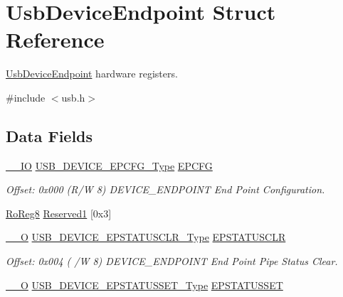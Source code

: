 \hypertarget{struct_usb_device_endpoint}{}\section{Usb\+Device\+Endpoint Struct Reference}
\label{struct_usb_device_endpoint}


\mbox{\hyperlink{struct_usb_device_endpoint}{Usb\+Device\+Endpoint}} hardware registers.  




{\ttfamily \#include $<$usb.\+h$>$}

\subsection*{Data Fields}
\begin{DoxyCompactItemize}
\item 
\mbox{\hyperlink{core__cm0plus_8h_aec43007d9998a0a0e01faede4133d6be}{\+\_\+\+\_\+\+IO}} \mbox{\hyperlink{union_u_s_b___d_e_v_i_c_e___e_p_c_f_g___type}{U\+S\+B\+\_\+\+D\+E\+V\+I\+C\+E\+\_\+\+E\+P\+C\+F\+G\+\_\+\+Type}} \mbox{\hyperlink{struct_usb_device_endpoint_aa4114789acba20c3584bf754ce06949e}{E\+P\+C\+FG}}
\begin{DoxyCompactList}\small\item\em Offset\+: 0x000 (R/W 8) D\+E\+V\+I\+C\+E\+\_\+\+E\+N\+D\+P\+O\+I\+NT End Point Configuration. \end{DoxyCompactList}\item 
\mbox{\hyperlink{group___s_a_m_d21_e15_a__definitions_ga0d957f1433aaf5d70e4dc2b68288442d}{Ro\+Reg8}} \mbox{\hyperlink{struct_usb_device_endpoint_a0ec4ccebd5bfbf4f17510e15a5a9ff81}{Reserved1}} \mbox{[}0x3\mbox{]}
\item 
\mbox{\hyperlink{core__cm0plus_8h_a7e25d9380f9ef903923964322e71f2f6}{\+\_\+\+\_\+O}} \mbox{\hyperlink{union_u_s_b___d_e_v_i_c_e___e_p_s_t_a_t_u_s_c_l_r___type}{U\+S\+B\+\_\+\+D\+E\+V\+I\+C\+E\+\_\+\+E\+P\+S\+T\+A\+T\+U\+S\+C\+L\+R\+\_\+\+Type}} \mbox{\hyperlink{struct_usb_device_endpoint_aadd29fcc878d56d2a66993c66f5aebea}{E\+P\+S\+T\+A\+T\+U\+S\+C\+LR}}
\begin{DoxyCompactList}\small\item\em Offset\+: 0x004 ( /W 8) D\+E\+V\+I\+C\+E\+\_\+\+E\+N\+D\+P\+O\+I\+NT End Point Pipe Status Clear. \end{DoxyCompactList}\item 
\mbox{\hyperlink{core__cm0plus_8h_a7e25d9380f9ef903923964322e71f2f6}{\+\_\+\+\_\+O}} \mbox{\hyperlink{union_u_s_b___d_e_v_i_c_e___e_p_s_t_a_t_u_s_s_e_t___type}{U\+S\+B\+\_\+\+D\+E\+V\+I\+C\+E\+\_\+\+E\+P\+S\+T\+A\+T\+U\+S\+S\+E\+T\+\_\+\+Type}} \mbox{\hyperlink{struct_usb_device_endpoint_a0599cae0d7041b16761adf0b17bf2997}{E\+P\+S\+T\+A\+T\+U\+S\+S\+ET}}

\end{DoxyCompactItemize}
